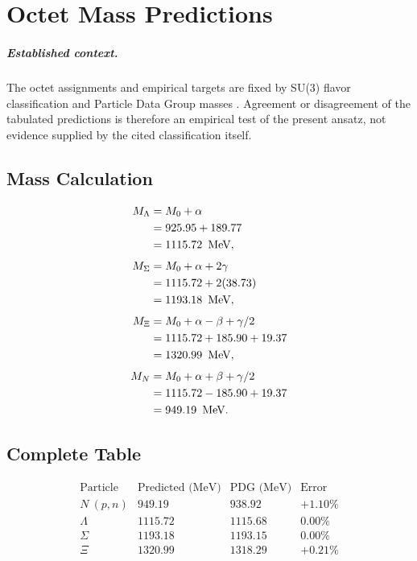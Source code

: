 \chapter{Octet Mass Predictions}
\label{ch:octet_predictions}


\paragraph{Established context.}
The octet assignments and empirical targets are fixed by SU(3) flavor
classification and Particle Data Group masses
\cite{GellMann1962,okubo1962,PDG2024}.  Agreement or disagreement of the tabulated
predictions is therefore an empirical test of the present ansatz, not evidence
supplied by the cited classification itself.

\section{Mass Calculation}

\[
\begin{aligned}
M_{\Lambda} &= M_0 + \alpha \\
            &= 925.95 + 189.77 \\
            &= 1115.72\ \,\text{MeV}, \\[4pt]
M_{\Sigma} &= M_0 + \alpha + 2\gamma \\
           &= 1115.72 + 2(38.73) \\
           &= 1193.18\ \,\text{MeV}, \\[4pt]
M_{\Xi} &= M_0 + \alpha - \beta + \gamma/2 \\
        &= 1115.72 + 185.90 + 19.37 \\
        &= 1320.99\ \,\text{MeV}, \\[4pt]
M_N &= M_0 + \alpha + \beta + \gamma/2 \\
    &= 1115.72 - 185.90 + 19.37 \\
    &= 949.19\ \,\text{MeV}.
\end{aligned}
\]

\section{Complete Table}

\[
\begin{array}{lccc}
\text{Particle} & \text{Predicted (MeV)} & \text{PDG (MeV)} & \text{Error} \\
\hline
N\ (p,n) & 949.19 & 938.92 & +1.10\% \\
\Lambda   & 1115.72 & 1115.68 & 0.00\% \\
\Sigma    & 1193.18 & 1193.15 & 0.00\% \\
\Xi       & 1320.99 & 1318.29 & +0.21\%
\end{array}
\]

